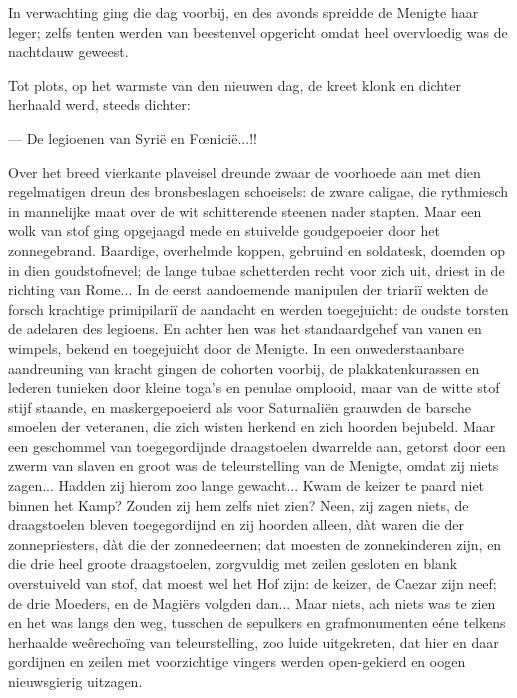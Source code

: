 \documentclass[a4paper, 12pt, oneside, dutch]{article}
\begin{document}
In verwachting ging die dag voorbij, en des avonds spreidde de Menigte haar leger; zelfs tenten werden van beestenvel opgericht omdat heel overvloedig was de nachtdauw geweest.

Tot plots, op het warmste van den nieuwen dag, de kreet klonk en dichter herhaald werd, steeds dichter:

--- De legioenen van Syrië en Fœnicië...!!

Over het breed vierkante plaveisel dreunde zwaar de voorhoede aan met dien regelmatigen dreun des bronsbeslagen schoeisels: de zware caligae, die rythmiesch in mannelijke maat over de wit schitterende steenen nader stapten. Maar een wolk van stof ging opgejaagd mede en stuivelde goudgepoeier door het zonnegebrand. Baardige, overhelmde koppen, gebruind en soldatesk, doemden op in dien goudstofnevel; de lange tubae schetterden recht voor zich uit, driest in de richting van Rome... In de eerst aandoemende manipulen der triariï wekten de forsch krachtige primipilariï de aandacht en werden toegejuicht: de oudste torsten de adelaren des legioens. En achter hen was het standaardgehef van vanen en wimpels, bekend en toegejuicht door de Menigte. In een onwederstaanbare aandreuning van kracht gingen de cohorten voorbij, de plakkatenkurassen en lederen tunieken door kleine toga's en penulae omplooid, maar van de witte stof stijf staande, en maskergepoeierd als voor Saturnaliën grauwden de barsche smoelen der veteranen, die zich wisten herkend en zich hoorden bejubeld. Maar een geschommel van toegegordijnde draagstoelen dwarrelde aan, getorst door een zwerm van slaven en groot was de teleurstelling van de Menigte, omdat zij niets zagen... Hadden zij hierom zoo lange gewacht... Kwam de keizer te paard niet binnen het Kamp? Zouden zij hem zelfs niet zien? Neen, zij zagen niets, de draagstoelen bleven toegegordijnd en zij hoorden alleen, dàt waren die der zonnepriesters, dàt die der zonnedeernen; dat moesten de zonnekinderen zijn, en die drie heel groote draagstoelen, zorgvuldig met zeilen gesloten en blank overstuiveld van stof, dat moest wel het Hof zijn: de keizer, de Caezar zijn neef; de drie Moeders, en de Magiërs volgden dan... Maar niets, ach niets was te zien en het was langs den weg, tusschen de sepulkers en grafmonumenten eéne telkens herhaalde weêrechoïng van teleurstelling, zoo luide uitgekreten, dat hier en daar gordijnen en zeilen met voorzichtige vingers werden open-gekierd en oogen nieuwsgierig uitzagen.
\end{document}
